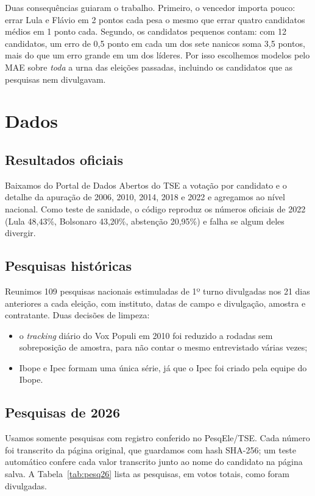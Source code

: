 \documentclass[10.5pt,a4paper]{article}
\begin{document}
Duas consequências guiaram o trabalho. Primeiro, o vencedor importa pouco: errar Lula e Flávio em 2 pontos cada pesa o mesmo que errar quatro candidatos médios em 1 ponto cada. Segundo, os candidatos pequenos contam: com 12 candidatos, um erro de 0,5 ponto em cada um dos sete nanicos soma 3,5 pontos, mais do que um erro grande em um dos líderes. Por isso escolhemos modelos pelo MAE sobre \emph{toda} a urna das eleições passadas, incluindo os candidatos que as pesquisas nem divulgavam.

\section{Dados}

\subsection{Resultados oficiais}
Baixamos do Portal de Dados Abertos do TSE a votação por candidato e o detalhe da apuração de 2006, 2010, 2014, 2018 e 2022 e agregamos ao nível nacional. Como teste de sanidade, o código reproduz os números oficiais de 2022 (Lula 48,43\%, Bolsonaro 43,20\%, abstenção 20,95\%) e falha se algum deles divergir.

\subsection{Pesquisas históricas}
Reunimos 109 pesquisas nacionais estimuladas de 1º turno divulgadas nos 21 dias anteriores a cada eleição, com instituto, datas de campo e divulgação, amostra e contratante. Duas decisões de limpeza:
\begin{itemize}
\item o \emph{tracking} diário do Vox Populi em 2010 foi reduzido a rodadas sem sobreposição de amostra, para não contar o mesmo entrevistado várias vezes;
\item Ibope e Ipec formam uma única série, já que o Ipec foi criado pela equipe do Ibope.
\end{itemize}

\subsection{Pesquisas de 2026}
Usamos somente pesquisas com registro conferido no PesqEle/TSE. Cada número foi transcrito da página original, que guardamos com hash SHA-256; um teste automático confere cada valor transcrito junto ao nome do candidato na página salva. A Tabela~\ref{tab:pesq26} lista as pesquisas, em votos totais, como foram divulgadas.
\end{document}
